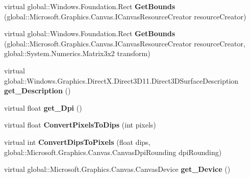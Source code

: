 \begin{DoxyCompactItemize}
\item 
\mbox{\label{class_microsoft_1_1_graphics_1_1_canvas_1_1_canvas_bitmap_a8b7155d2c58fbb8167dbdb9bf0d24f40}} 
virtual global\+::\+Windows.\+Foundation.\+Rect {\bfseries Get\+Bounds} (global\+::\+Microsoft.\+Graphics.\+Canvas.\+I\+Canvas\+Resource\+Creator resource\+Creator)
\item 
\mbox{\label{class_microsoft_1_1_graphics_1_1_canvas_1_1_canvas_bitmap_a12c526eb447c88ab11afffd320e1511e}} 
virtual global\+::\+Windows.\+Foundation.\+Rect {\bfseries Get\+Bounds} (global\+::\+Microsoft.\+Graphics.\+Canvas.\+I\+Canvas\+Resource\+Creator resource\+Creator, global\+::\+System.\+Numerics.\+Matrix3x2 transform)
\item 
\mbox{\label{class_microsoft_1_1_graphics_1_1_canvas_1_1_canvas_bitmap_adbae6cf16736de995445a0e9d2e00511}} 
virtual global\+::\+Windows.\+Graphics.\+Direct\+X.\+Direct3\+D11.\+Direct3\+D\+Surface\+Description {\bfseries get\+\_\+\+Description} ()
\item 
\mbox{\label{class_microsoft_1_1_graphics_1_1_canvas_1_1_canvas_bitmap_a036cc2f1feacbee8069bc29472eef2ca}} 
virtual float {\bfseries get\+\_\+\+Dpi} ()
\item 
\mbox{\label{class_microsoft_1_1_graphics_1_1_canvas_1_1_canvas_bitmap_aaeef506401f2494157b1c143d3846e0b}} 
virtual float {\bfseries Convert\+Pixels\+To\+Dips} (int pixels)
\item 
\mbox{\label{class_microsoft_1_1_graphics_1_1_canvas_1_1_canvas_bitmap_a0f0828753af0e3ad633e67fd3552f3e0}} 
virtual int {\bfseries Convert\+Dips\+To\+Pixels} (float dips, global\+::\+Microsoft.\+Graphics.\+Canvas.\+Canvas\+Dpi\+Rounding dpi\+Rounding)
\item 
\mbox{\label{class_microsoft_1_1_graphics_1_1_canvas_1_1_canvas_bitmap_aeac60d19e76342788c96babbe98c63fb}} 
virtual global\+::\+Microsoft.\+Graphics.\+Canvas.\+Canvas\+Device {\bfseries get\+\_\+\+Device} ()

\end{DoxyCompactItemize}
